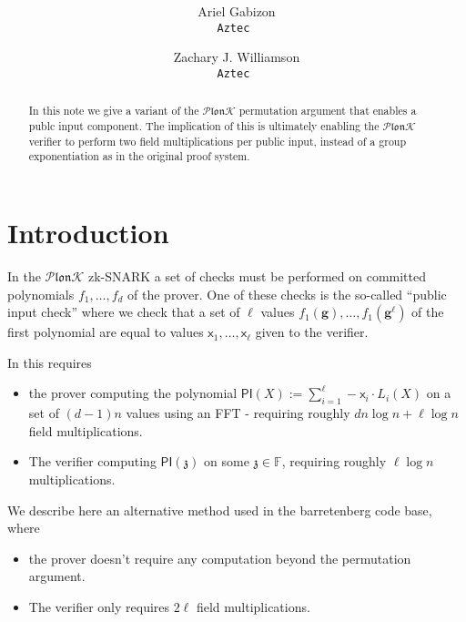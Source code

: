 \documentclass[11pt]{article} %
\title{ \bf \papertitle \\[0.72cm]}
\author{ Ariel Gabizon\\ \tt{Aztec}  \and Zachary J. Williamson\\ \tt{Aztec} }
\newcommand{\plonk}{\ensuremath{\mathcal{P} \mathfrak{lon}\mathcal{K}}\xspace}
\newcommand{\F}{\ensuremath{\mathbb F}\xspace}
\newcommand{\chalpoint}{\ensuremath{\mathfrak{z}}\xspace}
\newcommand{\defeq}{:=}
\newcommand{\inp}{\ensuremath{\mathsf{x}}\xspace}
\newcommand{\hgen}{\ensuremath{\mathbf{g}}\xspace}
\newcommand{\pubinppoly}{\ensuremath{\mathsf{PI}}\xspace}
\begin{document}
    \maketitle

\begin{abstract}
	In this note we give a variant of the \plonk permutation argument\cite{plonk} that enables a publc input component. The implication of this is ultimately enabling the \plonk verifier to perform two field multiplications per public input, instead of a group exponentiation as in the original proof system.
	
\end{abstract}

\section{Introduction}
In the \plonk zk-SNARK \cite{plonk} a set of checks must be performed on committed polynomials $f_1,\ldots,f_d$ of the prover.
One of these checks is the so-called ``public input check''
where we check that a set of $\ell$ values $f_1(\hgen),\ldots,f_1(\hgen^{\ell})$ of the first polynomial are equal to values $\inp_1,\ldots,\inp_{\ell}$ given to the verifier.

In \cite{plonk} this requires 
\begin{itemize}
 \item 
the prover computing the polynomial $\pubinppoly(X)\defeq \sum_ {i=1}^{\ell} -\inp_i \cdot L_i(X)$ on a set of $(d-1)n$ values using an FFT - requiring roughly  $dn\log n+\ell\log n$ field multiplications.
\item The verifier computing $\pubinppoly(\chalpoint)$ on some $\chalpoint\in\F$, requiring roughly $\ell \log n$ multiplications.
\end{itemize}
We describe here an alternative method used in the barretenberg code base, where
\begin{itemize}
 \item 
the prover doesn't require any computation beyond the permutation argument. 
\item The verifier only requires $2\ell$ field multiplications. 
\end{itemize}
\end{document}
